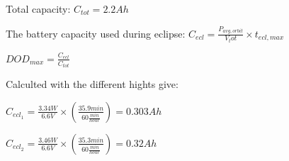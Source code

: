 \vspace{5 mm}Total capacity: $C_{tot} = 2.2 Ah$

The battery capacity used during eclipse: $C_{ecl} = \frac{P_{avg,orbit}}{V_tot}\times t_{ecl,max}$

 $DOD_{max} = \frac{C_{ecl}}{C_{tot}}$

\vspace{5 mm}Calculted with the different hights give:

\vspace{5 mm}$C_{ecl_1} = \frac{3.34W}{6.6V}\times(\frac{35.9min}{60\frac{min}{hour}}) = 0.303 Ah$

$C_{ecl_2} = \frac{3.46W}{6.6V}\times(\frac{35.3min}{60\frac{min}{hour}}) = 0.32 Ah$





